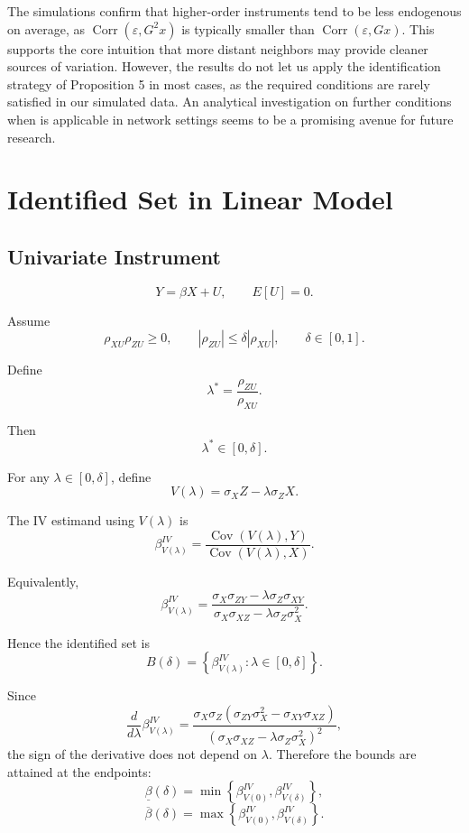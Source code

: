 \documentclass[12pt]{article}
\begin{document}
The simulations confirm that higher-order instruments tend to be less endogenous on average, as $\operatorname{Corr}(\varepsilon, G^2x)$ is typically smaller than $\operatorname{Corr}(\varepsilon, Gx)$. This supports the core intuition that more distant neighbors may provide cleaner sources of variation. However, the results do not let us apply the identification strategy of Proposition 5 in most cases, as the required conditions are rarely satisfied in our simulated data. An analytical investigation on further conditions when \textcite{nevo2012} is applicable in network settings seems to be a promising avenue for future research.



\nocite{nevo2012}
\printbibliography


\appendix

\newpage 


\section{Identified Set in Linear Model}\label{app:proofs}

\subsection{Univariate Instrument}
\[
Y=\beta X+U,\qquad E[U]=0.
\]

Assume
\[
\rho_{XU}\rho_{ZU}\ge 0,
\qquad
|\rho_{ZU}|\le \delta |\rho_{XU}|,
\qquad \delta\in[0,1].
\]

Define
\[
\lambda^*
=
\frac{\rho_{ZU}}{\rho_{XU}}.
\]

Then
\[
\lambda^*\in[0,\delta].
\]

For any \(\lambda\in[0,\delta]\), define
\[
V(\lambda)=\sigma_X Z-\lambda \sigma_Z X.
\]

The IV estimand using \(V(\lambda)\) is
\[
\beta^{IV}_{V(\lambda)}
=
\frac{\operatorname{Cov}(V(\lambda),Y)}
     {\operatorname{Cov}(V(\lambda),X)}.
\]

Equivalently,
\[
\beta^{IV}_{V(\lambda)}
=
\frac{
\sigma_X\sigma_{ZY}
-
\lambda\sigma_Z\sigma_{XY}
}{
\sigma_X\sigma_{XZ}
-
\lambda\sigma_Z\sigma_X^2
}.
\]

Hence the identified set is
\[
B(\delta)
=
\left\{
\beta^{IV}_{V(\lambda)}:\lambda\in[0,\delta]
\right\}.
\]

Since
\[
\frac{d}{d\lambda}
\beta^{IV}_{V(\lambda)}
=
\frac{
\sigma_X\sigma_Z
\left(
\sigma_{ZY}\sigma_X^2
-
\sigma_{XY}\sigma_{XZ}
\right)
}{
\left(
\sigma_X\sigma_{XZ}
-
\lambda\sigma_Z\sigma_X^2
\right)^2
},
\]
the sign of the derivative does not depend on \(\lambda\). Therefore the bounds are attained at the endpoints:
\[
\underline{\beta}(\delta)
=
\min\left\{
\beta^{IV}_{V(0)},
\beta^{IV}_{V(\delta)}
\right\},
\]
\[
\overline{\beta}(\delta)
=
\max\left\{
\beta^{IV}_{V(0)},
\beta^{IV}_{V(\delta)}
\right\}.
\]
\end{document}
